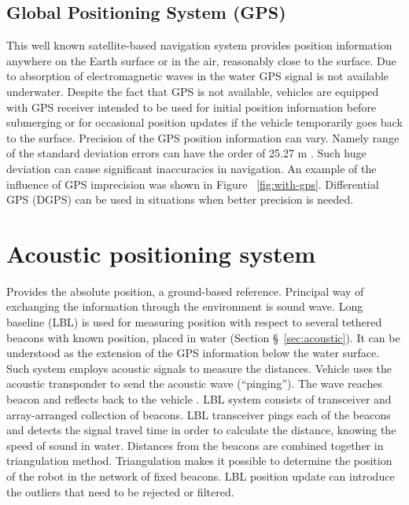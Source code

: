 \subsection{Global Positioning System (GPS)}
This well known satellite-based navigation system provides position information anywhere on the Earth surface or in the air, reasonably close to the surface. Due to absorption of electromagnetic waves in the water GPS signal is not available underwater. Despite the fact that GPS is not available, vehicles are equipped with GPS receiver intended to be used for initial position information before submerging or for occasional position updates if the vehicle temporarily goes back to the surface. Precision of the GPS position information can vary. Namely range of the standard deviation errors can have the order of 25.27 m \cite{farrell98}. Such huge deviation can cause significant inaccuracies in navigation. An example of the influence of GPS imprecision was shown in Figure ~\ref{fig:with-gps}. Differential GPS (DGPS) \cite{farrell98} can be used in situations when better precision is needed.
\section{Acoustic positioning system}
Provides the absolute position, a ground-based reference. Principal way of exchanging the information through the environment is sound wave. Long baseline (LBL) is used for measuring position with respect to several tethered beacons with known position, placed in water (Section \S~\ref{sec:acoustic}). It can be understood as the extension of the GPS information below the water surface. Such system employs acoustic signals to measure the distances. Vehicle uses the acoustic transponder to send the acoustic wave (``pinging''). The wave reaches beacon and reflects back to the vehicle . LBL system consists of transceiver and array-arranged collection of beacons. LBL transceiver pings each of the beacons and detects the signal travel time in order to calculate the distance, knowing the speed of sound in water. Distances from the beacons are combined together in triangulation method. Triangulation makes it possible to determine the position of the robot in the network of fixed beacons. LBL position update can introduce the outliers that need to be rejected or filtered. 

